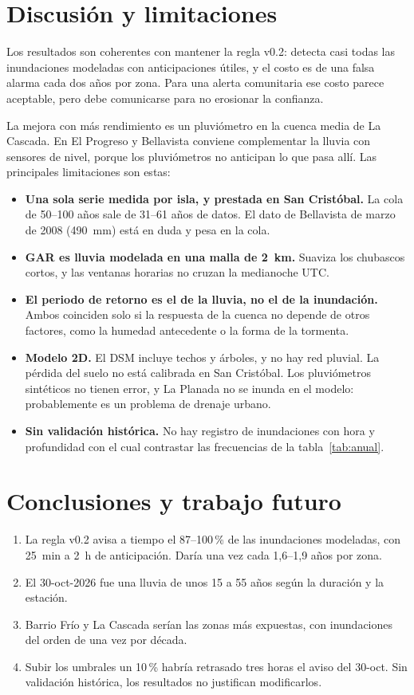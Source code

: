 \documentclass{sosg-informe}
\begin{document}
\section{Discusión y limitaciones}

Los resultados son coherentes con mantener la regla v0.2: detecta casi todas las inundaciones modeladas con anticipaciones útiles, y el costo es de una falsa alarma cada dos años por zona. Para una alerta comunitaria ese costo parece aceptable, pero debe comunicarse para no erosionar la confianza.

La mejora con más rendimiento es un pluviómetro en la cuenca media de La Cascada. En El Progreso y Bellavista conviene complementar la lluvia con sensores de nivel, porque los pluviómetros no anticipan lo que pasa allí. Las principales limitaciones son estas:
\begin{itemize}
  \item \textbf{Una sola serie medida por isla, y prestada en San Cristóbal.} La cola de 50--100 años sale de 31--61 años de datos. El dato de Bellavista de marzo de 2008 (490~mm) está en duda y pesa en la cola.
  \item \textbf{GAR es lluvia modelada en una malla de 2~km.} Suaviza los chubascos cortos, y las ventanas horarias no cruzan la medianoche UTC.
  \item \textbf{El periodo de retorno es el de la lluvia, no el de la inundación.} Ambos coinciden solo si la respuesta de la cuenca no depende de otros factores, como la humedad antecedente o la forma de la tormenta.
  \item \textbf{Modelo 2D.} El DSM incluye techos y árboles, y no hay red pluvial. La pérdida del suelo no está calibrada en San Cristóbal. Los pluviómetros sintéticos no tienen error, y La Planada no se inunda en el modelo: probablemente es un problema de drenaje urbano.
  \item \textbf{Sin validación histórica.} No hay registro de inundaciones con hora y profundidad con el cual contrastar las frecuencias de la tabla~\ref{tab:anual}.
\end{itemize}

\section{Conclusiones y trabajo futuro}
\begin{enumerate}
  \item La regla v0.2 avisa a tiempo el 87--100\,\% de las inundaciones modeladas, con 25~min a 2~h de anticipación. Daría \alto{} una vez cada 1,6--1,9 años por zona.
  \item El 30-oct-2026 fue una lluvia de unos 15 a 55 años según la duración y la estación.
  \item Barrio Frío y La Cascada serían las zonas más expuestas, con inundaciones del orden de una vez por década.
  \item Subir los umbrales un 10\,\% habría retrasado tres horas el aviso del 30-oct. Sin validación histórica, los resultados no justifican modificarlos.
\end{enumerate}
\end{document}
